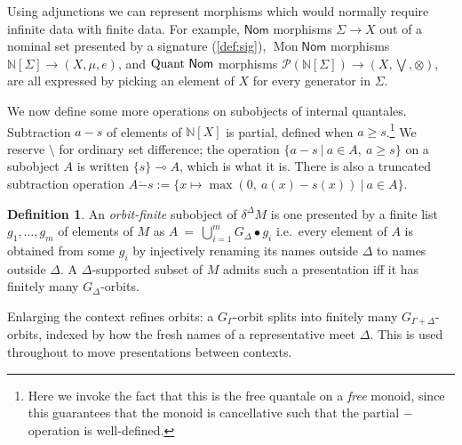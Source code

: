 \documentclass{article}
\theoremstyle{definition}
\newtheorem{definition}{Definition}[section]
\newcommand{\N}{\mathbb{N}}
\newcommand{\cP}{\mathcal{P}}
\newcommand{\cat}[1]{\mathsf{#1}}
\newcommand{\Nom}{\cat{Nom}}
\newcommand{\Mon}{\operatorname{Mon}}
\newcommand{\monus}{\mathbin{\dot-}}
\begin{document}
Using adjunctions we can represent morphisms which would normally require infinite data with finite data. For example, $\Nom$ morphisms $\Sigma \to X$ out of a nominal set presented by a signature (\cref{def:sig}), $\Mon \Nom$ morphisms $\N[\Sigma]\to(X,\mu,e)$, and ${\rm Quant}\ \Nom$ morphisms $\cP(\N[\Sigma]) \to (X,\bigvee,\otimes)$, are all expressed by picking an element of $X$ for every generator in $\Sigma$.


We now define some more operations on subobjects of internal quantales. Subtraction $a-s$ of elements of $\N[X]$ is partial, defined when $a\geq s$.\footnote{Here we invoke the fact that this is the free quantale on a {\it free} monoid, since this guarantees that the monoid is cancellative such that the partial $-$ operation is well-defined.} We reserve $\setminus$ for ordinary set difference; the operation $\{a-s\ |\ a\in A,\ a\geq s\}$ on a subobject $A$ is written $\{s\}\multimap A$, which is what it is. There is also a truncated subtraction operation $A\monus s:=\{x\mapsto \max(0,\ a(x)-s(x))\ |\ a \in A\}$.


\begin{definition}
    \label{def:orbitfinite}
    An {\it orbit-finite} subobject of $\delta^\Delta M$ is one presented
    by a finite list $g_1,\dots,g_m$ of elements of $M$ as
    $A\ =\ \bigcup_{i=1}^{m}G_\Delta\bullet g_i$
    i.e.\ every element of $A$ is obtained from some $g_i$ by injectively
    renaming its names outside $\Delta$ to names outside $\Delta$. A
    $\Delta$-supported subset of $M$ admits such a presentation iff it has
    finitely many $G_\Delta$-orbits.
\end{definition}

Enlarging the context refines orbits: a $G_\Gamma$-orbit splits into finitely many $G_{\Gamma+\Delta}$-orbits, indexed by how the fresh names of a representative meet $\Delta$. This is used throughout to move presentations between contexts.
\end{document}
